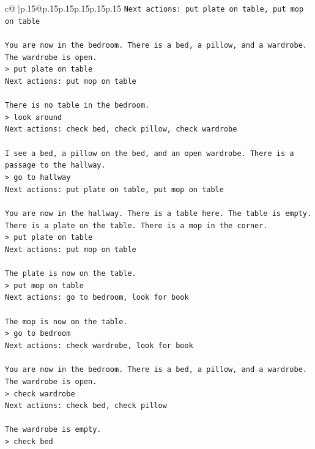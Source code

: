 \documentclass{article}
\begin{document}
{\begin{supertabular}{c@{$\;$}|p{.15\linewidth}@{}p{.15\linewidth}p{.15\linewidth}p{.15\linewidth}p{.15\linewidth}p{.15\linewidth}}
{{{\texttt{Next actions: put plate on table, put mop on table} \\
\\ 
\texttt{You are now in the bedroom. There is a bed, a pillow, and a wardrobe. The wardrobe is open.  } \\
\texttt{> put plate on table  } \\
\texttt{Next actions: put mop on table} \\
\\ 
\texttt{There is no table in the bedroom.  } \\
\texttt{> look around  } \\
\texttt{Next actions: check bed, check pillow, check wardrobe} \\
\\ 
\texttt{I see a bed, a pillow on the bed, and an open wardrobe. There is a passage to the hallway.  } \\
\texttt{> go to hallway  } \\
\texttt{Next actions: put plate on table, put mop on table} \\
\\ 
\texttt{You are now in the hallway. There is a table here. The table is empty. There is a plate on the table. There is a mop in the corner.  } \\
\texttt{> put plate on table  } \\
\texttt{Next actions: put mop on table} \\
\\ 
\texttt{The plate is now on the table.  } \\
\texttt{> put mop on table  } \\
\texttt{Next actions: go to bedroom, look for book} \\
\\ 
\texttt{The mop is now on the table.  } \\
\texttt{> go to bedroom  } \\
\texttt{Next actions: check wardrobe, look for book} \\
\\ 
\texttt{You are now in the bedroom. There is a bed, a pillow, and a wardrobe. The wardrobe is open.  } \\
\texttt{> check wardrobe  } \\
\texttt{Next actions: check bed, check pillow} \\
\\ 
\texttt{The wardrobe is empty.  } \\
\texttt{> check bed  } \\
}}}
\end{supertabular}}
\end{document}
